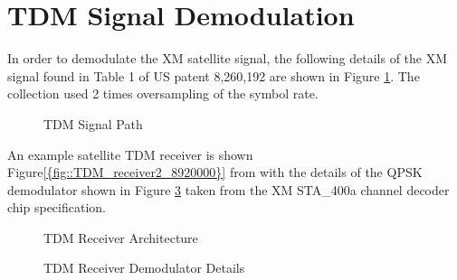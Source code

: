 \documentclass[conference,onecolumn]{IEEEtran}
\begin{document}
\section{TDM Signal Demodulation}
In order to demodulate the XM satellite signal, the following details of the XM signal found in Table 1 of US patent 8,260,192 \cite{a2008_us8260192b2} are shown in Figure \ref {fig::physical_layer_info}.  The collection used 2 times oversampling of the symbol rate.  
\begin{figure}[H]
	\centerline{}
	\caption{TDM Signal Path \cite{a2008_us8260192b2}}
	\label{fig::physical_layer_info}
\end{figure}
An example satellite TDM receiver is shown Figure\ref{{fig::TDM_receiver2_8920000}} from \cite{marko_2012_us8667344b2} with the details of the QPSK demodulator shown in Figure \ref{fig::TDM_receiver_STA400} taken from the XM STA\_400a channel decoder chip specification.
\begin{figure}[H]
	\centerline{}
	\caption{TDM Receiver Architecture \cite{marko_2012_us8667344b2}}
	\label{fig::TDM_receiver2_8920000}
\end{figure}

\begin{figure}[H]
	\centerline{}
	\caption{TDM Receiver Demodulator Details }
	\label{fig::TDM_receiver_STA400}
\end{figure}
\end{document}
